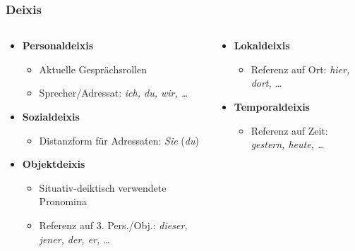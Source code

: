 \begin{frame}
\frametitle{Deixis}

\begin{columns}

\begin{column}[t]{0.5\textwidth}		
\begin{itemize}
	\item \textbf{Personaldeixis} 
	
	\begin{itemize}
		\item Aktuelle Gesprächsrollen
		\item Sprecher/Adressat: \emph{ich, du, wir, \dots}
	\end{itemize}
	
	\item \textbf{Sozialdeixis}
	
	\begin{itemize}
		\item Distanzform für Adressaten: \emph{Sie} (\vs \emph{du})
	\end{itemize}
	
	\item \textbf{Objektdeixis}
	
	\begin{itemize}
		\item Situativ-deiktisch verwendete Pronomina
		\item Referenz auf 3. Pers./Obj.: \emph{dieser, jener, der, er, \dots}
	\end{itemize}
	
\end{itemize}
\end{column}
	
\begin{column}[t]{0.5\textwidth}
	\begin{itemize}
			\item \textbf{Lokaldeixis}
				
		\begin{itemize}
			\item Referenz auf Ort: \emph{hier, dort, \dots}
		\end{itemize}
			
		\item \textbf{Temporaldeixis}
				
		\begin{itemize}
			\item Referenz auf Zeit: \emph{gestern, heute, \dots}
		\end{itemize}
				
			\end{itemize}
\end{column}
	
\end{columns}

\end{frame}



